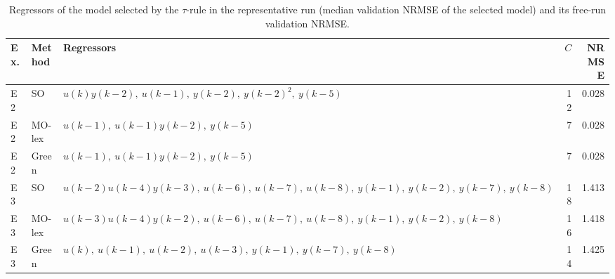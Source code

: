 \begin{table}[t]
\centering
\caption{Regressors of the model selected by the $\tau$-rule in the representative run (median validation NRMSE of the selected model) and its free-run validation NRMSE.}
\label{tab:models}
\setlength{\tabcolsep}{3pt}
\footnotesize
\begin{tabular}{llp{8.5cm}rr}
\toprule
Ex. & Method & Regressors & $C$ & NRMSE \\
\midrule
E2 & SO & $u(k) y(k-2),\ u(k-1),\ y(k-2),\ y(k-2)^{2},\ y(k-5)$ & 12 & 0.028 \\
E2 & MO-lex & $u(k-1),\ u(k-1) y(k-2),\ y(k-5)$ & 7 & 0.028 \\
E2 & Green & $u(k-1),\ u(k-1) y(k-2),\ y(k-5)$ & 7 & 0.028 \\
\midrule
E3 & SO & $u(k-2) u(k-4) y(k-3),\ u(k-6),\ u(k-7),\ u(k-8),\ y(k-1),\ y(k-2),\ y(k-7),\ y(k-8)$ & 18 & 1.413 \\
E3 & MO-lex & $u(k-3) u(k-4) y(k-2),\ u(k-6),\ u(k-7),\ u(k-8),\ y(k-1),\ y(k-2),\ y(k-8)$ & 16 & 1.418 \\
E3 & Green & $u(k),\ u(k-1),\ u(k-2),\ u(k-3),\ y(k-1),\ y(k-7),\ y(k-8)$ & 14 & 1.425 \\
\bottomrule
\end{tabular}
\end{table}
